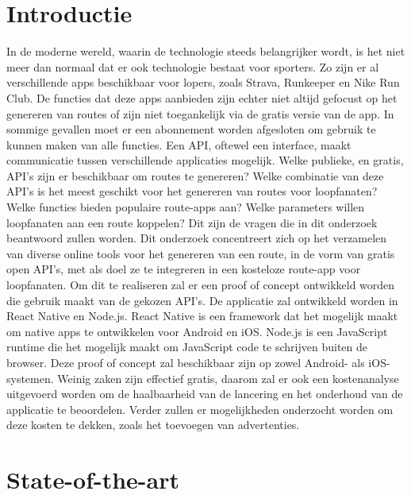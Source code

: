 
\section{Introductie}%
\label{sec:introductie}

In de moderne wereld,
waarin de tech\-no\-lo\-gie \@ steeds belangrijker wordt,
is het niet meer dan normaal dat er ook technologie bestaat voor sporters.
Zo zijn er al verschillende apps beschikbaar voor lopers, zoals Strava, Runkeeper en Nike Run Club.
De functies dat deze apps aanbieden zijn echter niet altijd gefocust op het genereren van routes of zijn niet toegankelijk via de gratis versie van de app.
In sommige gevallen moet er een abonnement worden afgesloten om gebruik te kunnen maken van alle functies. Een API, oftewel een interface, maakt communicatie tussen verschillende applicaties mogelijk.
Welke publieke, en gratis, API's zijn er beschikbaar om routes te genereren? Welke combinatie van deze API's is het meest geschikt voor het genereren van routes voor loopfanaten? Welke functies bieden populaire route-apps aan? Welke parameters willen loopfanaten aan een route koppelen? Dit zijn de vragen die in dit onderzoek beantwoord zullen worden.
Dit onderzoek concentreert zich op het verzamelen van diverse online tools voor het genereren van een route, in de vorm van gratis open API's, met als doel ze te integreren in een kosteloze route-app voor loopfanaten.
Om dit te realiseren zal er een proof of concept ontwikkeld worden die gebruik maakt van de gekozen API's. De applicatie zal ontwikkeld worden in React Native en Node.js. React Native is een framework dat het mogelijk maakt om native apps te ontwikkelen voor Android en iOS\@. Node.js is een JavaScript runtime die het mogelijk maakt om JavaScript code te schrijven buiten de browser.
Deze proof of concept zal beschikbaar zijn op zowel Android- als iOS-systemen. Weinig zaken zijn effectief gratis, daarom zal er ook een kostenanalyse uitgevoerd worden om de haalbaarheid van de lancering en het onderhoud van de applicatie te beoordelen.
Verder zullen er mogelijkheden onderzocht worden om deze kosten te dekken, zoals het toevoegen van advertenties.



\section{State-of-the-art}%
\label{sec:state-of-the-art}

